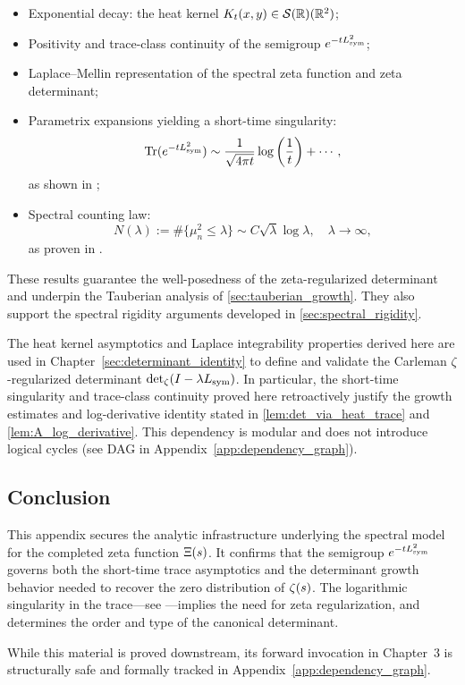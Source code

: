 \begin{itemize}
  \item Exponential decay: the heat kernel \( K_t(x,y) \in \mathcal{S}(\mathbb{R})(\mathbb{R}^2) \);
  \item Positivity and trace-class continuity of the semigroup \( e^{-t L_{\mathrm{sym}}^2} \);
  \item Laplace–Mellin representation of the spectral zeta function and zeta determinant;
  \item Parametrix expansions yielding a short-time singularity:
  \[
  \operatorname{Tr}(e^{-t L_{\mathrm{sym}}^2}) \sim \frac{1}{\sqrt{4\pi t}} \log\left( \frac{1}{t} \right) + \cdots,
  \]
  as shown in ;

  \item Spectral counting law:
  \[
  N(\lambda) := \#\{ \mu_n^2 \le \lambda \}
  \sim C \sqrt{\lambda} \log \lambda, \quad \lambda \to \infty,
  \]
  as proven in .
\end{itemize}

These results guarantee the well-posedness of the zeta-regularized determinant and underpin the Tauberian analysis of \cref{sec:tauberian_growth}. They also support the spectral rigidity arguments developed in \cref{sec:spectral_rigidity}.

\begin{remark}
The heat kernel asymptotics and Laplace integrability properties derived here are used in Chapter~\ref{sec:determinant_identity} to define and validate the Carleman \(\zeta\)-regularized determinant \( \det\nolimits_{\zeta}(I - \lambda L_{\mathrm{sym}}) \). In particular, the short-time singularity and trace-class continuity proved here retroactively justify the growth estimates and log-derivative identity stated in \cref{lem:det_via_heat_trace} and \cref{lem:A_log_derivative}. This dependency is modular and does not introduce logical cycles (see DAG in Appendix~\ref{app:dependency_graph}).
\end{remark}

\subsection*{Conclusion}

This appendix secures the analytic infrastructure underlying the spectral model for the completed zeta function \( \Xi(s) \). It confirms that the semigroup \( e^{-t L_{\mathrm{sym}}^2} \) governs both the short-time trace asymptotics and the determinant growth behavior needed to recover the zero distribution of \( \zeta(s) \). The logarithmic singularity in the trace—see —implies the need for zeta regularization, and determines the order and type of the canonical determinant.

\medskip
\noindent
While this material is proved downstream, its forward invocation in Chapter~3 is structurally safe and formally tracked in Appendix~\ref{app:dependency_graph}.

